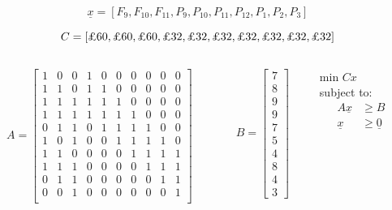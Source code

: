 \documentclass{beamer}
\begin{document}
\begin{frame}
  $$\underline{x} = \left[F_9, F_{10}, F_{11}, P_9, P_{10}, P_{11}, P_{12}, P_{1}, P_{2}, P_{3}\right]$$

  $$C = \left[\text{\textsterling} 60, \text{\textsterling} 60, \text{\textsterling} 60, \text{\textsterling} 32, \text{\textsterling} 32, \text{\textsterling} 32, \text{\textsterling} 32, \text{\textsterling} 32, \text{\textsterling} 32, \text{\textsterling} 32\right]$$

  \begin{columns}
    \begin{column}{0.5\textwidth}
      $$A =
      \begin{bmatrix}{1}
        1 & 0 & 0 & 1 & 0 & 0 & 0 & 0 & 0 & 0 \\
        1 & 1 & 0 & 1 & 1 & 0 & 0 & 0 & 0 & 0 \\
        1 & 1 & 1 & 1 & 1 & 1 & 0 & 0 & 0 & 0 \\
        1 & 1 & 1 & 1 & 1 & 1 & 1 & 0 & 0 & 0 \\
        0 & 1 & 1 & 0 & 1 & 1 & 1 & 1 & 0 & 0 \\
        1 & 0 & 1 & 0 & 0 & 1 & 1 & 1 & 1 & 0 \\
        1 & 1 & 0 & 0 & 0 & 0 & 1 & 1 & 1 & 1 \\
        1 & 1 & 1 & 0 & 0 & 0 & 0 & 1 & 1 & 1 \\
        0 & 1 & 1 & 0 & 0 & 0 & 0 & 0 & 1 & 1 \\
        0 & 0 & 1 & 0 & 0 & 0 & 0 & 0 & 0 & 1 \\
      \end{bmatrix}$$
    \end{column}
    \begin{column}{0.3\textwidth}
      $$B = \begin{bmatrix}{1} 7 \\ 8 \\ 9 \\ 9 \\ 7 \\ 5 \\ 4 \\ 8 \\ 4 \\ 3 \end{bmatrix}$$
    \end{column}
    \begin{column}{0.2\textwidth}
      min $Cx$\\
      subject to:
      \begin{align*}
        A \underline{x} &\geq B\\
        \underline{x} &\geq \underline{0}
      \end{align*}
    \end{column}
  \end{columns}
\end{frame}
\end{document}
